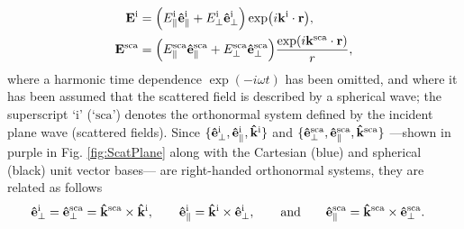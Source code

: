 %
%
%
 \begin{align}
	\vb{E}^\text{i} & =  \qty(E_\parallel^\text{i}\vu{e}^\text{i}_\parallel + E_\perp^\text{i} \vu{e}_\perp^\text{i}) \exp(i\vb{k}^\text{i}\cdot\vb{r}),
 \label{eq:Ei} \\
	\vb{E}^\text{sca} & = \qty(E_\parallel^\text{sca}\vu{e}^\text{sca}_\parallel + E_\perp^\text{sca} \vu{e}_\perp^\text{sca}) \frac{\exp(i\vb{k}^\text{sca}\cdot\vb{r})}{r},
 \label{eq:Es}
 \end{align}
%
where a harmonic time dependence $\exp(-i\omega t)$ has been omitted, and where it has been assumed that the scattered field is described by a spherical wave; the superscript `$\text{i}$' (`$\text{sca}$') denotes the orthonormal system defined by the incident plane wave (scattered fields).  Since $\{\vu{e}_\perp^\text{i}, \vu{e}_\parallel^\text{i},\vu{k}^\text{i} \}$ and $\{\vu{e}_\perp^\text{sca}, \vu{e}_\parallel^\text{sca},\vu{k}^\text{sca} \}$ ---shown in purple in Fig. \ref{fig:ScatPlane}  along with the Cartesian (blue) and spherical (black) unit vector bases--- are right-handed orthonormal systems, they are related as follows
%
 \begin{align}
	\vu{e}_\perp^\text{i} = \vu{e}_\perp^\text{sca}  & =  \vu{k}^\text{sca} \times \vu{k}^\text{i},
		\qquad
	\vu{e}^\text{i}_\parallel = \vu{k}^\text{i}\times \vu{e}^\text{i}_\perp,
		\qquad\text{and}\qquad
	\vu{e}^\text{sca}_\parallel = \vu{k}^\text{sca} \times \vu{e}_\perp^\text{sca}.
 \label{eq:eParaPerp}
 \end{align}

